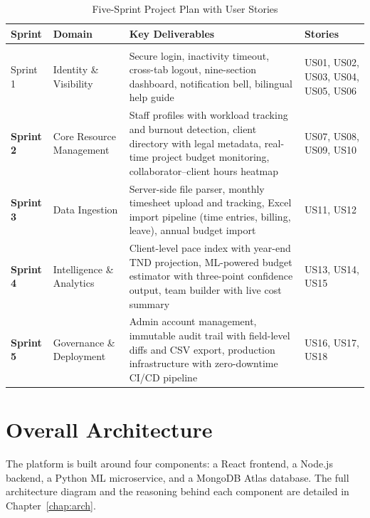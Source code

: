 \documentclass[12pt,a4paper]{report}
\begin{document}
\begin{longtable}{>{\bfseries}p{1.6cm} p{3cm} p{4.8cm} p{3.4cm}}
  \caption{Five-Sprint Project Plan with User Stories}\label{tab:sprints}\\
  \toprule
  \textbf{Sprint} & \textbf{Domain} & \textbf{Key Deliverables} & \textbf{Stories}\\
  \midrule\endhead
  \midrule\multicolumn{4}{r}{\small\itshape Continued\ldots}\\\endfoot
  \bottomrule\endlastfoot

  Sprint 1 & Identity \& Visibility
            & Secure login, inactivity timeout, cross-tab logout, nine-section dashboard, notification bell, bilingual help guide
            & US01, US02, US03, US04, US05, US06\\[6pt]

  Sprint 2 & Core Resource Management
            & Staff profiles with workload tracking and burnout detection, client directory with legal metadata, real-time project budget monitoring, collaborator--client hours heatmap
            & US07, US08, US09, US10\\[6pt]

  Sprint 3 & Data Ingestion
            & Server-side file parser, monthly timesheet upload and tracking, Excel import pipeline (time entries, billing, leave), annual budget import
            & US11, US12\\[6pt]

  Sprint 4 & Intelligence \& Analytics
            & Client-level pace index with year-end TND projection, ML-powered budget estimator with three-point confidence output, team builder with live cost summary
            & US13, US14, US15\\[6pt]

  Sprint 5 & Governance \& Deployment
            & Admin account management, immutable audit trail with field-level diffs and CSV export, production infrastructure with zero-downtime CI/CD pipeline
            & US16, US17, US18\\[6pt]

\end{longtable}

\section{Overall Architecture}

The platform is built around four components: a React frontend, a Node.js backend,
a Python ML microservice, and a MongoDB Atlas database. The full architecture diagram
and the reasoning behind each component are detailed in Chapter~\ref{chap:arch}.
\end{document}
